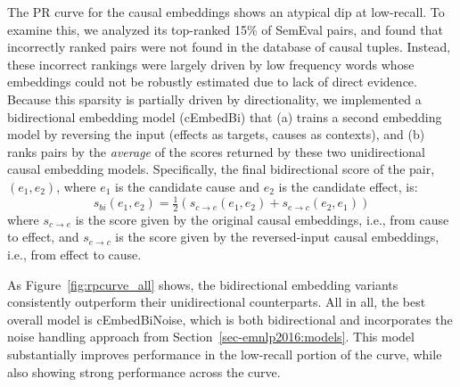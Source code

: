 The PR curve for the causal embeddings shows an atypical dip at low-recall.  To examine this, we analyzed its top-ranked 15\% of SemEval pairs, and found that incorrectly ranked pairs were not found in the database of causal tuples.  Instead, these incorrect rankings were largely driven by low frequency words whose embeddings could not be robustly estimated due to lack of direct evidence.  
Because this sparsity is partially driven by directionality, 
we implemented a bidirectional embedding model (cEmbedBi) that (a) trains a second embedding model by reversing the input (effects as targets, causes as contexts), and (b) ranks pairs by the \textit{average} of the scores returned by these two unidirectional causal embedding models. 
Specifically, the final bidirectional score of the pair, $(e_1, e_2)$, where $e_1$ is the candidate cause and $e_2$ is the candidate effect, is:
\begin{equation}
s_{bi}(e_1, e_2) = \tfrac{1}{2}(s_{c{\rightarrow}e}(e_1, e_2) + s_{e \rightarrow c}(e_2, e_1))
\end{equation}
where $s_{c \rightarrow e}$ is the score given by the original causal embeddings, i.e., from cause to effect, and $s_{e \rightarrow c}$ is the score given by the reversed-input causal embeddings, i.e., from effect to cause.

As Figure~\ref{fig:rpcurve_all} shows, the bidirectional embedding variants consistently outperform their unidirectional counterparts. 
All in all, the best overall model is cEmbedBiNoise, which is both bidirectional and incorporates the noise handling approach from Section~\ref{sec-emnlp2016:models}. This model substantially improves performance in the low-recall portion of the curve, while also showing strong performance across the curve. 



